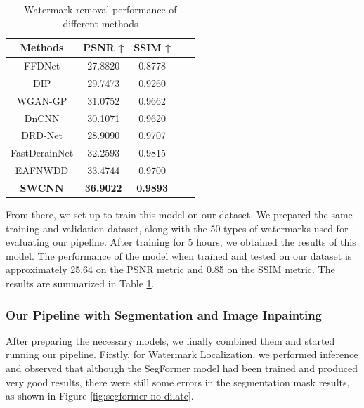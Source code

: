 \begin{table}[t]
    \centering
    \begin{tabular}{cccll}
        \hline
        \textbf{Methods}                             & \textbf{PSNR ↑}  & \textbf{SSIM ↑} \\ \hline
        FFDNet  \cite{zhang2018ffdnet}               & 27.8820          & 0.8778          \\
        DIP  \cite{ulyanov2018deep}                  & 29.7473          & 0.9260          \\
        WGAN-GP  \cite{yu2018generative}             & 31.0752          & 0.9662          \\
        DnCNN  \cite{zhang2017beyond}                & 30.1071          & 0.9620          \\
        {DRD-Net \cite{deng2019drd}}                 & 28.9090          & 0.9707          \\
        {FastDerainNet \cite{wang2020fastderainnet}} & 32.2593          & 0.9815          \\
        {EAFNWDD \cite{sun2021efficient}}            & 33.4744          & 0.9700          \\
        \textbf{SWCNN} \cite{2024swcnn}              & \textbf{36.9022} & \textbf{0.9893} \\ \hline
    \end{tabular}
    \caption[Watermark removal performance of different methods]{Watermark removal performance of different methods\cite{2024swcnn}}
    \label{table:swcnn}
\end{table}

From there, we set up to train this model on our dataset. We prepared the same training and validation dataset, along with the 50 types of watermarks used for evaluating our pipeline. After training for 5 hours, we obtained the results of this model. The performance of the model when trained and tested on our dataset is approximately 25.64 on the PSNR metric and 0.85 on the SSIM metric. The results are summarized in Table \ref{table:swcnn}.

\subsubsection{Our Pipeline with Segmentation and Image Inpainting}

After preparing the necessary models, we finally combined them and started running our pipeline. Firstly, for Watermark Localization, we performed inference and observed that although the SegFormer model had been trained and produced very good results, there were still some errors in the segmentation mask results, as shown in Figure \ref{fig:segformer-no-dilate}.

